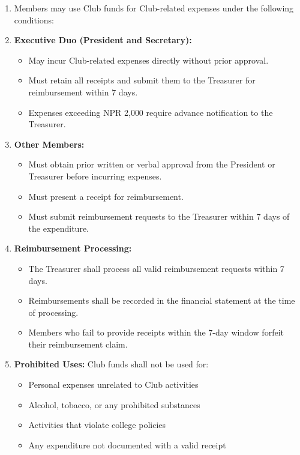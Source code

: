 
\begin{enumerate}[label=\alph*), leftmargin=2em, itemsep=0.3em]
    \item Members may use Club funds for Club-related expenses under the following conditions:
    
    \item \textbf{Executive Duo (President and Secretary):}
    \begin{itemize}[leftmargin=1.5em, itemsep=0.2em]
        \item May incur Club-related expenses directly without prior approval.
        \item Must retain all receipts and submit them to the Treasurer for reimbursement within 7 days.
        \item Expenses exceeding NPR 2,000 require advance notification to the Treasurer.
    \end{itemize}
    
    \item \textbf{Other Members:}
    \begin{itemize}[leftmargin=1.5em, itemsep=0.2em]
        \item Must obtain prior written or verbal approval from the President or Treasurer before incurring expenses.
        \item Must present a receipt for reimbursement.
        \item Must submit reimbursement requests to the Treasurer within 7 days of the expenditure.
    \end{itemize}
    
    \item \textbf{Reimbursement Processing:}
    \begin{itemize}[leftmargin=1.5em, itemsep=0.2em]
        \item The Treasurer shall process all valid reimbursement requests within 7 days.
        \item Reimbursements shall be recorded in the financial statement at the time of processing.
        \item Members who fail to provide receipts within the 7-day window forfeit their reimbursement claim.
    \end{itemize}
    
    \item \textbf{Prohibited Uses:} Club funds shall not be used for:
    \begin{itemize}[leftmargin=1.5em, itemsep=0.2em]
        \item Personal expenses unrelated to Club activities
        \item Alcohol, tobacco, or any prohibited substances
        \item Activities that violate college policies
        \item Any expenditure not documented with a valid receipt
    \end{itemize}
\end{enumerate}

